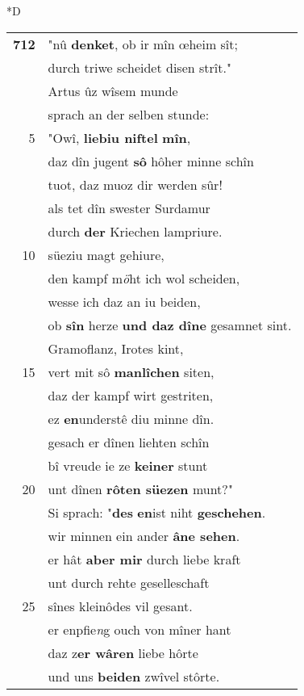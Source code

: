 \documentclass[8pt,a4paper,notitlepage]{article}
\begin{document}
\begin{table}[ht]
\begin{minipage}[t]{0.5\linewidth}
\small
\begin{center}*D
\end{center}
\begin{tabular}{rl}
\textbf{712} & "nû \textbf{denket}, ob ir mîn œheim sît;\\ 
 & durch triwe scheidet disen strît."\\ 
 & Artus ûz wîsem munde\\ 
 & sprach an der selben stunde:\\ 
5 & "Owî, \textbf{liebiu niftel} \textbf{mîn},\\ 
 & daz dîn jugent \textbf{sô} hôher minne schîn\\ 
 & tuot, daz muoz dir werden sûr!\\ 
 & als tet dîn swester Surdamur\\ 
 & durch \textbf{der} Kriechen lampriure.\\ 
10 & süeziu magt gehiure,\\ 
 & den kampf m\textit{ö}ht ich wol scheiden,\\ 
 & wesse ich daz an iu beiden,\\ 
 & ob \textbf{sîn} herze \textbf{und daz dîne} gesamnet sint.\\ 
 & Gramoflanz, Irotes kint,\\ 
15 & vert mit sô \textbf{manlîchen} siten,\\ 
 & daz der kampf wirt gestriten,\\ 
 & ez \textbf{en}understê diu minne dîn.\\ 
 & gesach er dînen liehten schîn\\ 
 & bî vreude ie ze \textbf{keiner} stunt\\ 
20 & unt dînen \textbf{rôten süezen} munt?"\\ 
 & Si sprach: "\textbf{des} \textbf{en}ist niht \textbf{geschehen}.\\ 
 & wir minnen ein ander \textbf{âne sehen}.\\ 
 & er hât \textbf{aber mir} durch liebe kraft\\ 
 & unt durch rehte geselleschaft\\ 
25 & sînes kleinôdes vil gesant.\\ 
 & er enpfie\textit{n}g ouch von mîner hant\\ 
 & daz z\textbf{er wâren} liebe hôrte\\ 
 & und uns \textbf{beiden} zwîvel stôrte.\\ 

\end{tabular}
\end{minipage}
\end{table}
\end{document}
